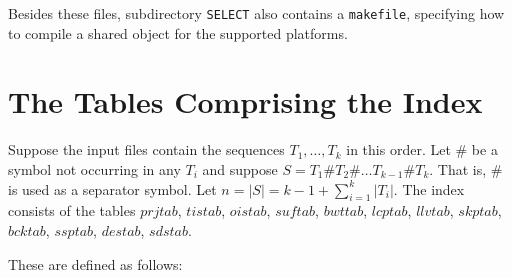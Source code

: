 \documentclass[12pt,titlepage]{article}
\newcommand{\Size}[1]{|#1|}
\newcommand{\LCP}[0]{\mathit{lcptab}}
\newcommand{\SUF}[0]{\mathit{suftab}}
\newcommand{\BCK}[0]{\mathit{bcktab}}
\newcommand{\PRJ}[0]{\mathit{prjtab}}
\newcommand{\TIS}[0]{\mathit{tistab}}
\newcommand{\OIS}[0]{\mathit{oistab}}
\newcommand{\BWT}[0]{\mathit{bwttab}}
\newcommand{\LLV}[0]{\mathit{llvtab}}
\newcommand{\SKP}[0]{\mathit{skptab}}
\newcommand{\SSP}[0]{\mathit{ssptab}}
\newcommand{\DES}[0]{\mathit{destab}}
\newcommand{\SDS}[0]{\mathit{sdstab}}
\begin{document}
Besides these files, subdirectory
\texttt{SELECT} also contains a \texttt{makefile}, specifying how to
compile a shared object for the supported platforms.

\section{The Tables Comprising the Index}\label{TheTables}
Suppose the input files contain the sequences \(T_{1},\ldots,T_{k}\) in this
order.  Let \(\#\) be a symbol not occurring in any \(T_{i}\) and suppose
\(S=T_{1}\#T_{2}\#\ldots T_{k-1}\#T_{k}\). That is, \(\#\) is used as a 
separator symbol. Let \(n=\Size{S}=k-1+\sum_{i=1}^{k}|T_{i}|\). The index 
consists of the tables 
$\PRJ$, $\TIS$, $\OIS$, $\SUF$, $\BWT$, $\LCP$, $\LLV$, 
$\SKP$, $\BCK$, $\SSP$, $\DES$, $\SDS$. 

These are defined as follows:
\end{document}
